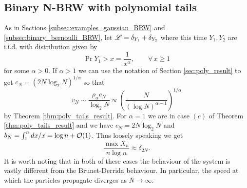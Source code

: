 \subsection{Binary N-BRW with polynomial tails}
As in Sections \ref{subsec:examples_gaussian_BRW} and \ref{subsec:binary_bernoulli_BRW}, let $\scr{L} = \delta_{Y_1} + \delta_{Y_2}$ where this time $Y_1, Y_2$ are i.i.d. with distribution given by
\begin{equation}
\Pr{Y_1 > x} = \frac{1}{x^\alpha},\qquad\forall\,x \geq 1
\end{equation}
for some $\alpha > 0$. If $\alpha > 1$ we can use the notation of Section \ref{sec:poly_result} to get $c_N = (2N \log_2 N)^{1/\alpha}$ so that
\begin{equation}\nonumber
v_N \sim \frac{\rho_\alpha c_N}{\log_2 N} \propto \left( \frac{N}{(\log N)^{\alpha - 1 }} \right)^{1/\alpha}
\end{equation}
by Theorem \ref{thm:poly_tails_result}. For $\alpha = 1$ we are in case $(c)$ of Theorem \ref{thm:poly_tails_result} and we have $c_N = 2 N \log_2 N$ and $b_N = \int^n_1 dx/x = \log n + \cal{O}(1)$. Thus loosely speaking we get 
\begin{equation}
\frac{\max X_n}{n \log n} \approx \delta_{2N}. 
\end{equation}
It is worth noting that in both of these cases the behaviour of the system is vastly different from the Brunet-Derrida behaviour. In particular, the speed at which the particles propagate diverges as $N \to \infty$. 
\newpage
